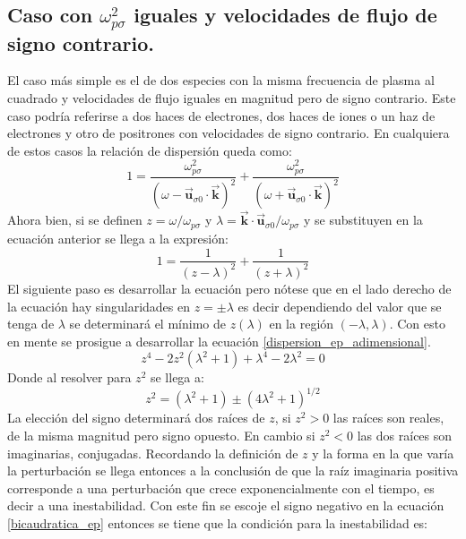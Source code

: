 \documentclass[12pt]{article}
\begin{document}
\subsection*{Caso con $\omega_{p\sigma}^2$ iguales y velocidades de flujo de signo contrario.}
El caso más simple es el de dos especies con la misma frecuencia de plasma al cuadrado y velocidades de flujo iguales en magnitud pero de signo contrario. Este caso podría referirse a dos haces de electrones, dos haces de iones o un haz de electrones y otro de positrones con velocidades de signo contrario. En cualquiera de estos casos la relación de dispersión queda como:
\begin{equation}
\label{dispersion_ep}
1= \frac{\omega_{p\sigma}^2}{(\omega - \overrightarrow{\textbf{u}}_{\sigma 0} \cdot \overrightarrow{\textbf{k}})^2} + \frac{\omega_{p\sigma}^2}{(\omega + \overrightarrow{\textbf{u}}_{\sigma 0} \cdot \overrightarrow{\textbf{k}})^2}
\end{equation}
Ahora bien, si se definen $z= \omega / \omega_{p\sigma}$ y $\lambda = \overrightarrow{\textbf{k}} \cdot \overrightarrow{\textbf{u}}_{\sigma 0}/ \omega_{p\sigma}$ y se substituyen en la ecuación anterior se llega a la expresión:
\begin{equation}
\label{dispersion_ep_adimensional}
1 = \frac{1}{(z - \lambda)^2} + \frac{1}{(z + \lambda)^2}
\end{equation}
El siguiente paso es desarrollar la ecuación pero nótese que en el lado derecho de la ecuación hay singularidades en $z= \pm \lambda$ es decir dependiendo del valor que se tenga de $\lambda$ se determinará el mínimo de $z(\lambda)$ en la región $(- \lambda, \lambda)$. Con esto en mente se prosigue a desarrollar la ecuación \ref{dispersion_ep_adimensional}.
\begin{equation}
z^4 -2z^2(\lambda^2 + 1) +\lambda ^4 -2 \lambda ^2 =0
\end{equation}
Donde al resolver para $z^2$ se llega a:
\begin{equation}
\label{bicaudratica_ep}
z^2= (\lambda^2 +1) \pm (4 \lambda ^2 + 1)^{1/2}
\end{equation}
La elección del signo determinará dos raíces de $z$, si $z^2 >0$ las raíces son reales, de la misma magnitud pero signo opuesto. En cambio si $z^2 <0$ las dos raíces son imaginarias, conjugadas. Recordando la definición de $z$ y la forma en la que varía la perturbación se llega entonces  a la conclusión de que la raíz imaginaria positiva corresponde a una perturbación que crece exponencialmente con el tiempo, es decir a una inestabilidad. Con este fin se escoje el signo negativo en la ecuación \ref{bicaudratica_ep} entonces se tiene que la condición para la inestabilidad es:
\end{document}
